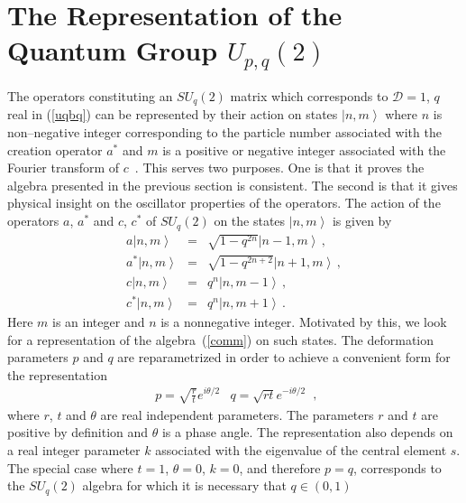 \documentclass[a4paper,12pt]{article}
\numberwithin{equation}{section}
\begin{document}
\section{The Representation of the Quantum Group $U_{p,q} \left( 2
 \right)$}
The operators constituting an $SU_q \left( 2 \right)$
 matrix which corresponds to $\mathcal{D} = 1$, $q$ real in
 (\ref{uqbq}) can be represented by their action on states
$\left|n,m \right
 \rangle$ where $n$ is non--negative
integer corresponding to the particle number associated with the
 creation operator $a^\ast$ and $m$ is a positive or negative
 integer associated with the Fourier transform of $c$~\cite{Ari}.
 This serves two purposes. One is that it proves the algebra
 presented in the previous section is consistent. The second is
 that it gives physical insight on the oscillator properties of the operators.
 The action of the operators $a$, $a^\ast$ and $c$, $c^\ast$ of $SU_q \left( 2 \right)$
 on the states $\left|n,m \right \rangle$ is given by
\begin{eqnarray}
a \left| n,m \right \rangle & = & \sqrt{1-q^{2n}} \left| n - 1,
m \right \rangle \, , \label{aa} \\
a^\ast \left| n,m \right \rangle & = & \sqrt{1-q^{2n+2}} \left| n + 1,
m \right \rangle \, , \\
c \left| n,m \right \rangle & = & q^n \left| n,m - 1 \right \rangle \, , \\
c^\ast \left| n,m \right \rangle & = & q^n \left| n,m + 1 \right \rangle \label{cast} \, .
\end{eqnarray}
Here $m$ is an integer and $n$ is a nonnegative integer.
Motivated by this, we look for a representation of the algebra~(\ref{comm}) on such states.
The deformation parameters $p$ and $q$ are reparametrized in order to achieve a convenient form for the representation
\begin{equation}
\begin{array}{cc}
p = \sqrt{\frac{r}{t}} e^{i \theta / 2} & q = \sqrt{r t} e^{-i \theta / 2} 
\end{array} \, ,
\end{equation}
where $r$, $t$ and $\theta$ are real independent parameters.
The parameters $r$ and $t$ are positive by definition and $\theta$ is a phase angle.
The representation also depends on a real integer parameter $k$ associated with the eigenvalue of the central element $s$.
The special case where $t = 1$, $\theta = 0$, $k = 0$, and therefore $p = q$,
 corresponds to the $SU_q \left( 2 \right)$ algebra for which it is necessary that $q\in \left( 0,1\right)$
\end{document}
